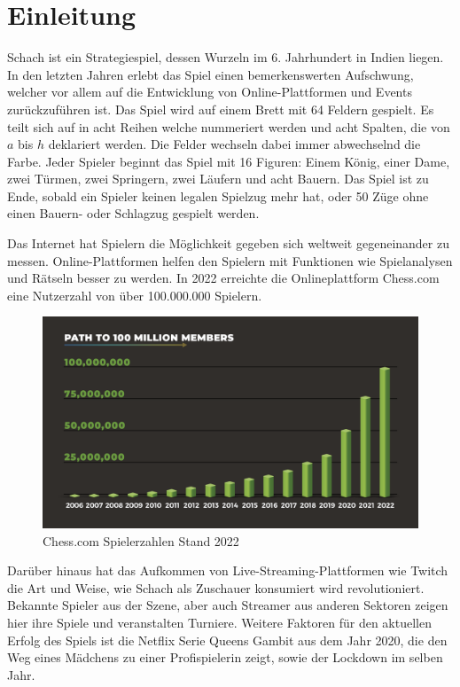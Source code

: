 
\chapter{Einleitung}

Schach ist ein Strategiespiel, dessen Wurzeln im 6. Jahrhundert in Indien liegen. In den letzten Jahren erlebt das Spiel einen bemerkenswerten Aufschwung, 
welcher vor allem auf die Entwicklung von Online-Plattformen und Events zurückzuführen ist. 
Das Spiel wird auf einem Brett mit 64 Feldern gespielt. Es teilt sich auf in acht Reihen welche nummeriert werden und acht Spalten, die von \(a\) bis \(h\) deklariert werden. 
Die Felder wechseln dabei immer abwechselnd die Farbe. Jeder Spieler beginnt das Spiel mit 16 Figuren: Einem König, einer Dame, zwei Türmen, zwei Springern, zwei Läufern und acht Bauern.
Das Spiel ist zu Ende, sobald ein Spieler keinen legalen Spielzug mehr hat, oder 50 Züge ohne einen Bauern- oder Schlagzug gespielt werden. 

Das Internet hat Spielern die Möglichkeit gegeben sich weltweit gegeneinander zu messen. Online-Plattformen helfen den Spielern mit Funktionen wie Spielanalysen und Rätseln besser zu werden.
In 2022 erreichte die Onlineplattform Chess.com eine Nutzerzahl von über 100.000.000 Spielern. 

\begin{figure}[h]
    \includegraphics[scale=0.2]{images/chess.com_users.png}
    \caption{Chess.com Spielerzahlen Stand 2022}
\end{figure}

Darüber hinaus hat das Aufkommen von Live-Streaming-Plattformen wie Twitch die Art und Weise, wie Schach als Zuschauer konsumiert wird revolutioniert. 
Bekannte Spieler aus der Szene, aber auch Streamer aus anderen Sektoren zeigen hier ihre Spiele und veranstalten Turniere. 
Weitere Faktoren für den aktuellen Erfolg des Spiels ist die Netflix Serie Queens Gambit aus dem Jahr 2020, die den Weg eines Mädchens zu einer 
Profispielerin zeigt, sowie der Lockdown im selben Jahr.


